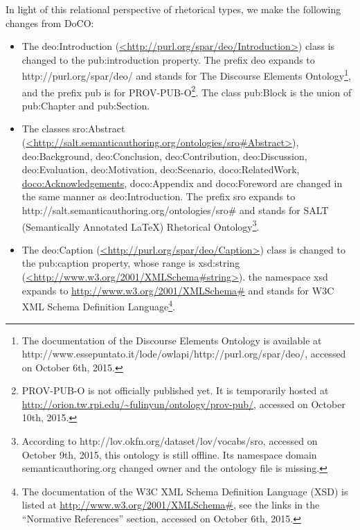 In light of this relational perspective of rhetorical types, we make the following changes from DoCO:

\begin{itemize}
	\item The deo:Introduction (\url{<http://purl.org/spar/deo/Introduction>}) class is changed to the pub:introduction property. The prefix deo expands to http://purl.org/spar/deo/ and stands for The Discourse Elements Ontology\footnote{The documentation of the Discourse Elements Ontology is available at http://www.essepuntato.it/lode/owlapi/http://purl.org/spar/deo/, accessed on October 6th, 2015.}, and the prefix pub is for PROV-PUB-O\footnote{PROV-PUB-O is not officially published yet. It is temporarily hosted at \url{http://orion.tw.rpi.edu/~fulinyun/ontology/prov-pub/}, accessed on October 10th, 2015.}. The class pub:Block is the union of pub:Chapter and pub:Section.
	\item The classes sro:Abstract (\url{<http://salt.semanticauthoring.org/ontologies/sro#Abstract>}), deo:Background, deo:Conclusion, deo:Contribution, deo:Discussion, deo:Evaluation, deo:Motivation, deo:Scenario, doco:RelatedWork, \url{doco:Acknowledgements}, doco:Appendix and doco:Foreword are changed in the same manner as deo:Introduction. The prefix sro expands to  http://salt.semanticauthoring.org/ontologies/sro\# and stands for SALT (Semantically Annotated \LaTeX \cite{groza2007salt}) Rhetorical Ontology\footnote{According to http://lov.okfn.org/dataset/lov/vocabs/sro, accessed on October 9th, 2015, this ontology is still offline. Its namespace domain semanticauthoring.org changed owner and the ontology file is missing.}.
	\item The deo:Caption (\url{<http://purl.org/spar/deo/Caption>}) class is changed to the pub:caption property, whose range is xsd:string (\url{<http://www.w3.org/2001/XMLSchema#string>}).  the namespace xsd expands to \url{http://www.w3.org/2001/XMLSchema#} and stands for W3C XML Schema Definition Language\footnote{The documentation of the W3C XML Schema Definition Language (XSD) is listed at \url{http://www.w3.org/2001/XMLSchema#}, see the links in the ``Normative References'' section, accessed on October 6th, 2015.}.

\end{itemize}
